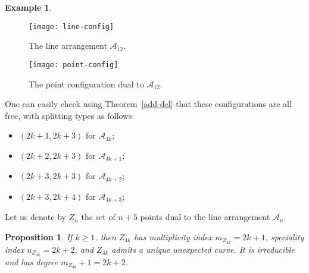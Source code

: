 \documentclass[12pt]{amsart}
\numberwithin{equation}{section}
\newtheorem{proposition}[theorem]{Proposition}
\theoremstyle{definition}
\newtheorem{example}[theorem]{Example}
\begin{document}
\begin{example}
\begin{figure}[!ht]    
    \texttt{[image: line-config]}
    \caption{The line arrangement $\mathcal{A}_{12}$.  }
         \label{fig:line-config}
\end{figure}

\begin{figure}[!ht]    
    \texttt{[image: point-config]}
    \caption{The point configuration dual to $\mathcal{A}_{12}$.  }
        \label{fig:point-config}
\end{figure}

One can easily check using Theorem~\ref{add-del} that these configurations are all free, with splitting types as follows:

\begin{itemize}
\item $(2k+1,2k+3)$ for $\mathcal A_{4k}$;

\item $(2k+2,2k+3)$ for $\mathcal A_{4k+1}$;

\item $(2k+3,2k+3)$ for $\mathcal A_{4k+2}$;

\item $(2k+3,2k+4)$ for $\mathcal A_{4k+3}$;

\end{itemize}
\end{example}

Let us denote by $Z_n$ the set of $n+5$ points dual to the line arrangement $\mathcal A_n$. 

\begin{proposition}
    \label{prop:unexpected irr}
If $k \ge 1$, then $Z_{4k}$ has multiplicity index $m_{Z_{4k}} = 2k +1$, speciality index $u_{Z_{4k}} = 2k +2$, and $Z_{4k}$ admits a unique unexpected curve. It is irreducible and has degree $m_{Z_{4k}} + 1 = 2k +2$. 
\end{proposition} 
\end{document}
